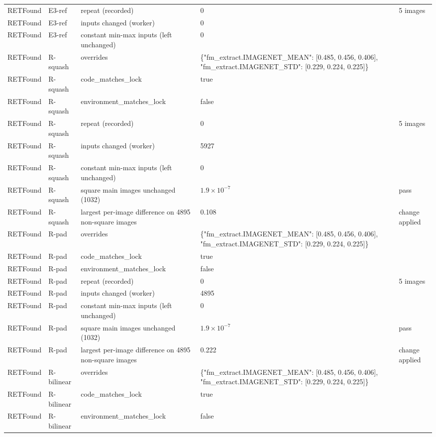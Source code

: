 \begin{longtable}{@{}llp{5.8cm}p{3.7cm}p{3.5cm}@{}}
RETFound & E3-ref & repeat (recorded) & 0 & 5 images \\
RETFound & E3-ref & inputs changed (worker) & 0 &  \\
RETFound & E3-ref & constant min-max inputs (left unchanged) & 0 &  \\
RETFound & R-squash & overrides & \{"fm\_extract.IMAGENET\_MEAN": [0.485, 0.456, 0.406], "fm\_extract.IMAGENET\_STD": [0.229, 0.224, 0.225]\} &  \\
RETFound & R-squash & code\_matches\_lock & true &  \\
RETFound & R-squash & environment\_matches\_lock & false &  \\
RETFound & R-squash & repeat (recorded) & 0 & 5 images \\
RETFound & R-squash & inputs changed (worker) & 5927 &  \\
RETFound & R-squash & constant min-max inputs (left unchanged) & 0 &  \\
RETFound & R-squash & square main images unchanged (1032) & $1.9\times10^{-7}$ & pass \\
RETFound & R-squash & largest per-image difference on 4895 non-square images & 0.108 & change applied \\
RETFound & R-pad & overrides & \{"fm\_extract.IMAGENET\_MEAN": [0.485, 0.456, 0.406], "fm\_extract.IMAGENET\_STD": [0.229, 0.224, 0.225]\} &  \\
RETFound & R-pad & code\_matches\_lock & true &  \\
RETFound & R-pad & environment\_matches\_lock & false &  \\
RETFound & R-pad & repeat (recorded) & 0 & 5 images \\
RETFound & R-pad & inputs changed (worker) & 4895 &  \\
RETFound & R-pad & constant min-max inputs (left unchanged) & 0 &  \\
RETFound & R-pad & square main images unchanged (1032) & $1.9\times10^{-7}$ & pass \\
RETFound & R-pad & largest per-image difference on 4895 non-square images & 0.222 & change applied \\
RETFound & R-bilinear & overrides & \{"fm\_extract.IMAGENET\_MEAN": [0.485, 0.456, 0.406], "fm\_extract.IMAGENET\_STD": [0.229, 0.224, 0.225]\} &  \\
RETFound & R-bilinear & code\_matches\_lock & true &  \\
RETFound & R-bilinear & environment\_matches\_lock & false &  \\

\end{longtable}
